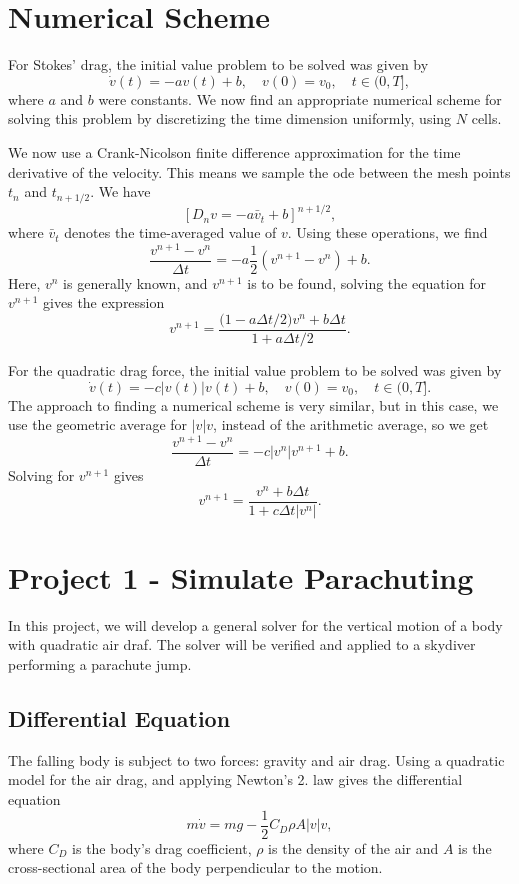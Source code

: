 \documentclass[a4paper, 11pt, titlepage, english]{article}
\begin{document}
\section{Numerical Scheme}
For Stokes' drag, the initial value problem to be solved was given by
$$\dot{v}(t) = -a v(t) + b, \quad  v(0) = v_0, \quad t \in (0, T],$$
where $a$ and $b$ were constants. We now find an appropriate numerical scheme for solving this problem by discretizing the time dimension uniformly, using $N$ cells.

We now use a Crank-Nicolson finite difference approximation for the time derivative of the velocity. This means we sample the ode between the mesh points $t_n$ and $t_{n+1/2}$. We have
$$[D_n v = -a \bar{v}_t + b]^{n+1/2},$$
where $\bar{v}_t$ denotes the time-averaged value of $v$. Using these operations, we find
$$\frac{v^{n+1} - v^n}{\Delta t} = -a \frac{1}{2}(v^{n+1} - v^{n}) + b.$$
Here, $v^{n}$ is generally known, and $v^{n+1}$ is to be found, solving the equation for $v^{n+1}$ gives the expression
$$v^{n+1} = \frac{\big(1 - a\Delta t/2\big)v^n + b\Delta t}{1 + a\Delta t / 2}.$$

For the quadratic drag force, the initial value problem to be solved was given by
$$\dot{v}(t) = -c |v(t)|v(t) + b, \quad  v(0) = v_0, \quad t \in (0, T].$$
The approach to finding a numerical scheme is very similar, but in this case, we use the geometric average for $|v|v$, instead of the arithmetic average, so we get
$$\frac{v^{n+1} - v^n}{\Delta t} = -c|v^n|v^{n+1} + b.$$
Solving for $v^{n+1}$ gives
$$v^{n+1} = \frac{v^n + b\Delta t}{1 + c\Delta t|v^n|}.$$


\clearpage

\section{Project 1 - Simulate Parachuting}

In this project, we will develop a general solver for the vertical motion of a body with quadratic air draf. The solver will be verified and applied to a skydiver performing a parachute jump.


\subsection*{Differential Equation}

The falling body is subject to two forces: gravity and air drag. Using a quadratic model for the air drag, and applying Newton's 2. law gives the differential equation
$$m\dot{v} = mg - \frac{1}{2}C_D \rho A |v| v,$$
where $C_D$ is the body's drag coefficient, $\rho$ is the density of the air and $A$ is the cross-sectional area of the body perpendicular to the motion.
\end{document}
